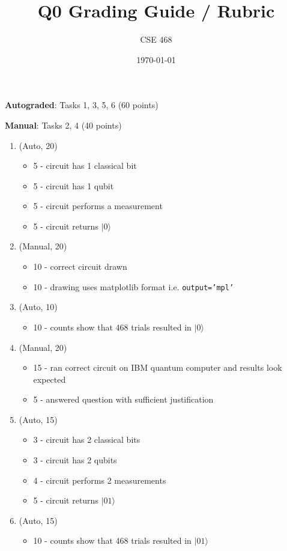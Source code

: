 \documentclass[12pt]{article}
\title{Q0 Grading Guide / Rubric}
\author{CSE 468}
\date{\today}
\begin{document}
\maketitle

\noindent \textbf{Autograded}: Tasks 1, 3, 5, 6 (60 points) 

\noindent \textbf{Manual}: Tasks 2, 4 (40 points)

\begin{enumerate}[font=\bfseries]
    \item (Auto, 20) 
    \begin{itemize}
        \item 5 - circuit has 1 classical bit
        \item 5 - circuit has 1 qubit
        \item 5 - circuit performs a measurement
        \item 5 - circuit returns $|0\rangle$
    \end{itemize}
    \item (Manual, 20)
    \begin{itemize}
        \item 10 - correct circuit drawn
        \item 10 - drawing uses matplotlib format i.e. \texttt{output='mpl'}
    \end{itemize}
    \item (Auto, 10) 
    \begin{itemize}
        \item 10 - counts show that 468 trials resulted in $|0\rangle$
    \end{itemize}
    \item (Manual, 20)
    \begin{itemize}
        \item 15 - ran correct circuit on IBM quantum computer and results look expected
        \item 5 - answered question with sufficient justification
    \end{itemize}
    \item (Auto, 15) 
    \begin{itemize}
        \item 3 - circuit has 2 classical bits
        \item 3 - circuit has 2 qubits
        \item 4 - circuit performs 2 measurements
        \item 5 - circuit returns $|01\rangle$
    \end{itemize}
    \item (Auto, 15) 
    \begin{itemize}
        \item 10 - counts show that 468 trials resulted in $|01\rangle$
    \end{itemize}
\end{enumerate}
\end{document}

